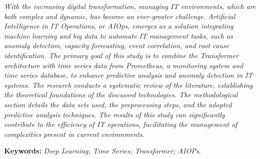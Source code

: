 \begin{resumo}
\textit{With the increasing digital transformation, managing IT environments, which are both complex and dynamic, has become an ever-greater challenge. Artificial Intelligence in IT Operations, or AIOps, emerges as a solution integrating machine learning and big data to automate IT management tasks, such as anomaly detection, capacity forecasting, event correlation, and root cause identification. The primary goal of this study is to combine the Transformer architecture with time series data from Prometheus, a monitoring system and time series database, to enhance predictive analysis and anomaly detection in IT systems. The research conducts a systematic review of the literature, establishing the theoretical foundations of the discussed technologies. The methodological section details the data sets used, the preprocessing steps, and the adopted predictive analysis techniques. The results of this study can significantly contribute to the efficiency of IT operations, facilitating the management of complexities present in current environments.}


\textbf{Keywords:} \textit{Deep Learning; Time Series; Transformer; AIOPs}.
\end{resumo}